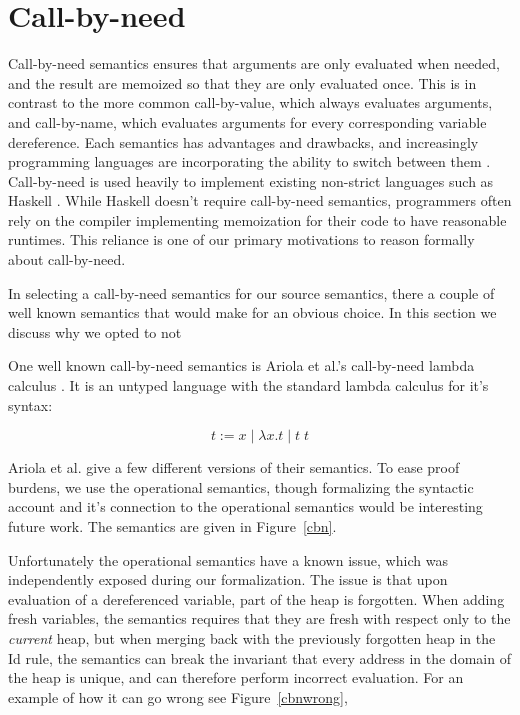 \section{Call-by-need}

Call-by-need semantics ensures that arguments are only evaluated when needed,
and the result are memoized so that they are only evaluated once. This is in
contrast to the more common call-by-value, which always evaluates arguments, and
call-by-name, which evaluates arguments for every corresponding variable
dereference. Each semantics has advantages and drawbacks, and increasingly
programming languages are incorporating the ability to switch between them
\cite{?}. Call-by-need is used heavily to implement existing non-strict
languages such as Haskell \cite{stg}. While Haskell doesn't require call-by-need
semantics, programmers often rely on the compiler implementing memoization for
their code to have reasonable runtimes. This reliance is one of our primary
motivations to reason formally about call-by-need.  

In selecting a call-by-need semantics for our source semantics, there a couple
of well known semantics that would make for an obvious choice. In this section
we discuss why we opted to not 

One well known call-by-need semantics is Ariola et al.'s call-by-need lambda
calculus \cite{?}. It is an untyped language with the standard lambda calculus
for it's syntax: 

  $$ t := x \; | \; \lambda x . t \; | \; t \; t $$

Ariola et al. give a few different versions of their semantics. To ease 
proof burdens, we use the operational semantics, though formalizing the
syntactic account and it's connection to the operational semantics would be
interesting future work. The semantics are given in Figure~\ref{cbn}. 

Unfortunately the operational semantics have a known issue, which was
independently exposed during our formalization. The issue is that upon
evaluation of a dereferenced variable, part of the heap is forgotten. When
adding fresh variables, the semantics requires that they are fresh with respect
only to the \emph{current} heap, but when merging back with the previously
forgotten heap in the Id rule, the semantics can break the invariant that every
address in the domain of the heap is unique, and can therefore perform incorrect
evaluation. For an example of how it can go wrong see Figure~\ref{cbnwrong}, 

